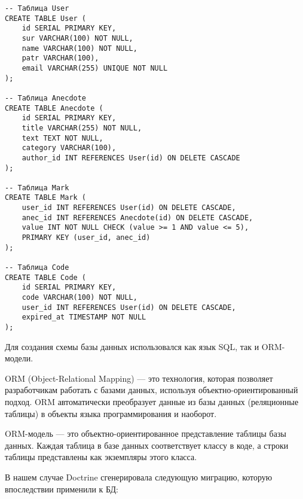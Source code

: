 \documentclass[pract]{SCWorks}
\begin{document}
\begin{verbatim}
-- Таблица User
CREATE TABLE User (
    id SERIAL PRIMARY KEY,
    sur VARCHAR(100) NOT NULL,
    name VARCHAR(100) NOT NULL,
    patr VARCHAR(100),
    email VARCHAR(255) UNIQUE NOT NULL
);

-- Таблица Anecdote
CREATE TABLE Anecdote (
    id SERIAL PRIMARY KEY,
    title VARCHAR(255) NOT NULL,
    text TEXT NOT NULL,
    category VARCHAR(100),
    author_id INT REFERENCES User(id) ON DELETE CASCADE
);

-- Таблица Mark
CREATE TABLE Mark (
    user_id INT REFERENCES User(id) ON DELETE CASCADE,
    anec_id INT REFERENCES Anecdote(id) ON DELETE CASCADE,
    value INT NOT NULL CHECK (value >= 1 AND value <= 5),
    PRIMARY KEY (user_id, anec_id)
);

-- Таблица Code
CREATE TABLE Code (
    id SERIAL PRIMARY KEY,
    code VARCHAR(100) NOT NULL,
    user_id INT REFERENCES User(id) ON DELETE CASCADE,
    expired_at TIMESTAMP NOT NULL
);
\end{verbatim}

Для создания схемы базы данных использовался как язык SQL, так и ORM-модели.

ORM (Object-Relational Mapping) — это технология, которая позволяет 
разработчикам работать с базами данных, используя объектно-ориентированный 
подход. ORM автоматически преобразует данные из базы данных (реляционные 
таблицы) в объекты языка программирования и наоборот.

ORM-модель — это объектно-ориентированное представление таблицы базы данных. 
Каждая таблица в базе данных соответствует классу в коде, а строки таблицы 
представлены как экземпляры этого класса.

В нашем случае Doctrine сгенерировала следующую миграцию, которую впоследствии
применили к БД:
\end{document}
